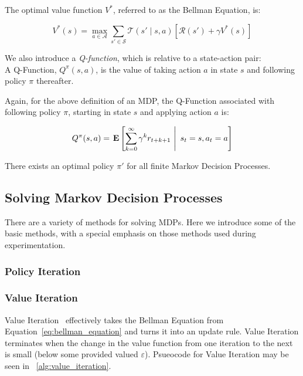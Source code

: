 \documentclass[11pt]{article}
\begin{document}
{ The \textup{optimal value function} $V^*$, referred to as the Bellman Equation, is:

\begin{equation}
V^*(s) = \max_{a \in \mathcal{A}} \sum_{s' \in \mathcal{S}} \mathcal{T}(s' \mid s, a) \left[\mathcal{R}(s') + \gamma V^*(s) \right]
\label{eq:bellman_equation}
\end{equation}}

We also introduce a {\it Q-function}, which is relative to a state-action pair: \\

{ A \textup{Q-Function}, $Q^\pi(s,a)$, is the value of taking action $a$ in state $s$ and following policy $\pi$ thereafter}.

Again, for the above definition of an MDP, the Q-Function associated with following policy $\pi$, starting in state $s$ and applying action $a$ is:

\begin{equation}
Q^\pi(s,a) = \left.{\bf E} \left[ \sum_{k=0}^\infty \gamma^k r_{t+k+1}\ \right|\ s_t = s, a_t = a \right]
\end{equation}

{\lemma There exists an optimal policy $\pi'$ for all finite Markov Decision Processes.}




\subsection{Solving Markov Decision Processes}

There are a variety of methods for solving MDPs. Here we introduce some of the basic methods, with a special emphasis on those methods used during experimentation.

\subsubsection{Policy Iteration}

\subsubsection{Value Iteration}

Value Iteration~\cite{bellman57} effectively takes the Bellman Equation from Equation~\ref{eq:bellman_equation} and turns it into an update rule. Value Iteration terminates when the change in the value function from one iteration to the next is small (below some provided valued $\varepsilon$).  Psueocode for Value Iteration may be seen in ~\ref{alg:value_iteration}.
\end{document}
